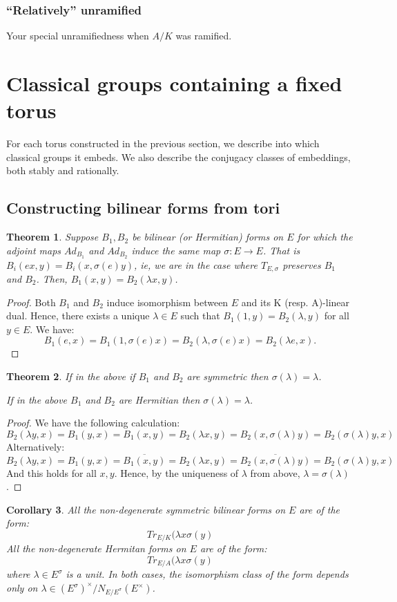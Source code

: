 \documentclass{article}
\theoremstyle{plain}
\newtheorem{theorem}{Theorem}[section]
\newtheorem{corollary}[theorem]{Corollary}
\theoremstyle{definition}
\numberwithin{equation}{section}
\begin{document}
\subsubsection{``Relatively'' unramified}

Your special unramifiedness when $A/K$ was ramified.

\section{Classical groups containing a fixed torus}

For each torus constructed in the previous section, we describe into which classical groups it embeds.  We also describe the conjugacy classes of embeddings, both stably and rationally.

\subsection{Constructing bilinear forms from tori}

\begin{theorem}
Suppose $B_1,B_2$ be bilinear (or Hermitian) forms on $E$ for which the adjoint maps $Ad_{B_1}$ and $Ad_{B_2}$ induce the same map $\sigma:E\rightarrow E$.
That is $B_i(ex,y) = B_i(x,\sigma(e)y)$, ie, we are in the case where $T_{E,\sigma}$ preserves $B_1$ and $B_2$.
Then, $B_1(x,y) = B_2(\lambda x,y)$.
\end{theorem}
\begin{proof}
Both $B_1$ and $B_2$ induce isomorphism between $E$ and its K (resp. A)-linear dual.
Hence, there exists a unique $\lambda\in E$ such that $B_1(1,y) = B_2(\lambda,y)$ for all $y\in E$.
We have:
\[ B_1(e,x) = B_1(1,\sigma(e)x) = B_2(\lambda,\sigma(e)x) = B_2(\lambda e,x). \]
\end{proof}
\begin{theorem}
If in the above if $B_1$ and $B_2$ are symmetric then $\sigma(\lambda)=\lambda$.

If in the above $B_1$ and $B_2$ are Hermitian then $\sigma(\lambda)=\lambda$.
\end{theorem}
\begin{proof}
We have the following calculation:
\[ B_2(\lambda y,x) = B_1(y,x) = B_1(x,y) = B_2(\lambda x,y) = B_2(x,\sigma(\lambda) y) = B_2(\sigma(\lambda)y,x) \]
Alternatively:
\[ B_2(\lambda y,x) = B_1(y,x) = \overline{B_1(x,y)} = B_2(\lambda x,y) = \overline{B_2(x,\sigma(\lambda) y)} = B_2(\sigma(\lambda)y,x) \]
And this holds for all $x,y$.
Hence, by the uniqueness of $\lambda$ from above, $\lambda=\sigma(\lambda)$.
\end{proof}
\begin{corollary}
All the non-degenerate symmetric bilinear forms on $E$ are of the form:
\[ Tr_{E/K}(\lambda x\sigma(y) \]
All the non-degenerate Hermitan forms on $E$ are of the form:
\[ Tr_{E/A}(\lambda x\sigma(y) \]
where $\lambda \in E^\sigma$ is a unit.
In both cases, the isomorphism class of the form depends only on $\lambda \in (E^\sigma)^\times/N_{E/E^\sigma}(E^\times)$.
\end{corollary}
\end{document}
